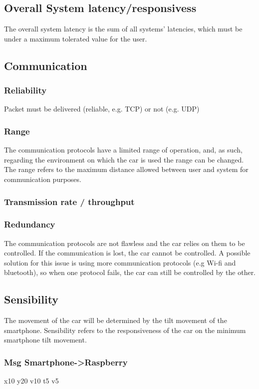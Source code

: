 \subsection{Overall System latency/responsivess}
\label{sec:org7fd1829}
The overall system latency is the sum of all systems' latencies, which must be
under a maximum tolerated value for the user.
\subsection{Communication}
\label{sec:org4241610}
\subsubsection{Reliability}
\label{sec:orgdcb920d}
Packet must be delivered (reliable, e.g. TCP) or not (e.g. UDP)
\subsubsection{Range}
\label{sec:org447a205}
The communication protocols have a limited range of operation, and, as such, regarding the environment on which the car is used the range can be changed.
The range refers to the maximum distance allowed between user and system for communication purposes.
\subsubsection{Transmission rate / throughput}
\label{sec:org10e75a5}
\subsubsection{Redundancy}
\label{sec:orgc5933fc}
The communication protocols are not flawless and the car relies on them to be controlled. If the communication is lost, the car cannot be controlled. A possible solution for this issue is using more communication protocols (e.g Wi-fi and bluetooth), so when one protocol fails, the car can still be controlled by the other.
\subsection{Sensibility}
\label{sec:org622e63a}
The movement of the car will be determined by the tilt movement of the smartphone. Sensibility refers to the responsiveness of the car on the minimum smartphone tilt movement.
\subsubsection{Msg Smartphone->Raspberry}
\label{sec:org6b5cb97}
x10 y20 v10
t5 v5

